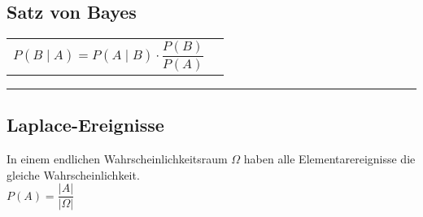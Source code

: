 \subsection{Satz von Bayes }
\begin{tabular}{ll}
  $P(B\mid A)=P(A\mid B) \cdot\dfrac{P(B)}{P(A)}$
  \vspace{1mm}
\end{tabular}
\hrule

\subsection{Laplace-Ereignisse }
In einem endlichen Wahrscheinlichkeitsraum $\Omega$ haben alle
Elementarereignisse die gleiche Wahrscheinlichkeit. \\
$P(A)=\dfrac{\left| A\right|}{\left|\Omega\right|}$ \\
